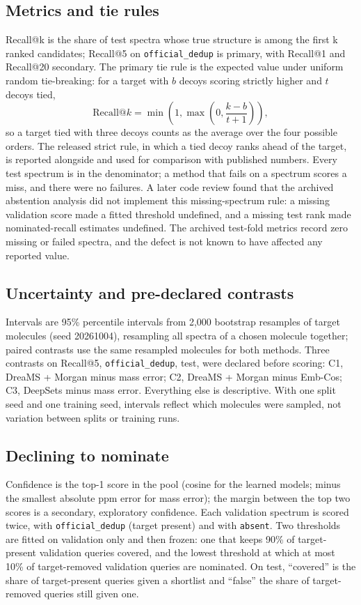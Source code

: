 \documentclass[11pt]{article}
\newcommand{\m}[1]{\texttt{#1}}
\begin{document}
\subsection{Metrics and tie rules}\label{sec:metrics}
Recall@k is the share of test spectra whose true structure is among the first k ranked candidates; Recall@5 on
\m{official\_dedup} is primary, with Recall@1 and Recall@20 secondary. The primary tie rule is the expected value under
uniform random tie-breaking: for a target with $b$ decoys scoring strictly higher and $t$ decoys tied,
\begin{equation}
\mathrm{Recall@}k = \min\!\left(1, \max\!\left(0, \frac{k - b}{t + 1}\right)\right),
\end{equation}
so a target tied with three decoys counts as the average over the four possible orders. The released strict rule, in
which a tied decoy ranks ahead of the target, is reported alongside and used for comparison with published numbers.
Every test spectrum is in the denominator; a method that fails on a spectrum scores a miss, and there were no failures.
A later code review found that the archived abstention analysis did not implement this missing-spectrum rule: a
missing validation score made a fitted threshold undefined, and a missing test rank made nominated-recall estimates
undefined. The archived test-fold metrics record zero missing or failed spectra, and the defect is not known to have
affected any reported value.

\subsection{Uncertainty and pre-declared contrasts}\label{sec:stats}
Intervals are 95\% percentile intervals from 2,000 bootstrap resamples of target molecules (seed 20261004), resampling
all spectra of a chosen molecule together; paired contrasts use the same resampled molecules for both methods. Three
contrasts on Recall@5, \m{official\_dedup}, test, were declared before scoring: C1, DreaMS + Morgan minus mass error;
C2, DreaMS + Morgan minus Emb-Cos; C3, DeepSets minus mass error. Everything else is descriptive. With one split seed and
one training seed, intervals reflect which molecules were sampled, not variation between splits or training runs.

\subsection{Declining to nominate}\label{sec:abst-methods}
Confidence is the top-1 score in the pool (cosine for the learned models; minus the smallest absolute ppm error for mass
error); the margin between the top two scores is a secondary, exploratory confidence. Each validation spectrum is scored
twice, with \m{official\_dedup} (target present) and with \m{absent}. Two thresholds are fitted on validation only and then
frozen: one that keeps 90\% of target-present validation queries covered, and the lowest threshold at which at most 10\%
of target-removed validation queries are nominated. On test, ``covered'' is the share of target-present queries given a
shortlist and ``false'' the share of target-removed queries still given one.
\end{document}
